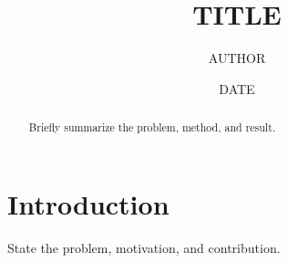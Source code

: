 \documentclass[11pt]{article}
\title{{{TITLE}}}
\author{{{AUTHOR}}}
\date{{{DATE}}}
\begin{document}
\maketitle

\begin{abstract}
Briefly summarize the problem, method, and result.
\end{abstract}

\section{Introduction}
\label{sec:introduction}

State the problem, motivation, and contribution.


\end{document}
